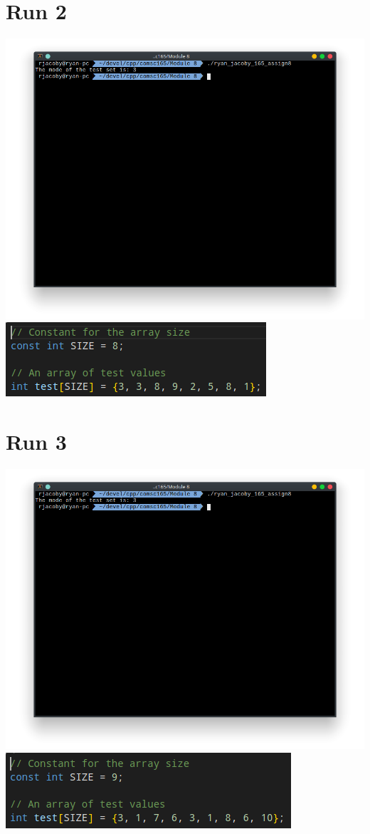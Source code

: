 \documentclass[letterpaper, 11pt]{article}
\begin{document}
\section*{Run 2}
\includegraphics[scale=0.5]{run2.png} \\
\includegraphics[scale=0.5]{run2_2.png}

\section*{Run 3}
\includegraphics[scale=0.5]{run3.png} \\
\includegraphics[scale=0.5]{run3_2.png}
\end{document}
